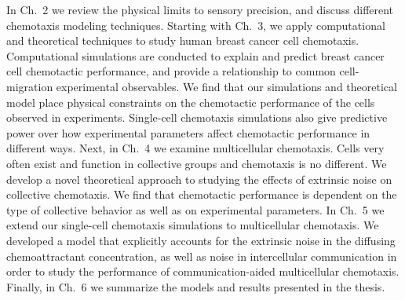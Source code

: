 In Ch.\ 2 we review the physical limits to sensory precision, and discuss different chemotaxis modeling techniques.
Starting with Ch.\ 3, we apply computational and theoretical techniques to study human breast cancer cell chemotaxis. Computational simulations are conducted to explain and predict breast cancer cell chemotactic performance, and provide a relationship to common cell-migration experimental observables. We find that our simulations and theoretical model place physical constraints on the chemotactic performance of the cells observed in experiments. Single-cell chemotaxis simulations also give predictive power over how experimental parameters affect chemotactic performance in different ways.
Next, in Ch.\ 4 we examine multicellular chemotaxis. Cells very often exist and function in collective groups and chemotaxis is no different. We develop a novel theoretical approach to studying the effects of extrinsic noise on collective chemotaxis. We find that chemotactic performance is dependent on the type of collective behavior as well as on experimental parameters.
In Ch.\ 5 we extend our single-cell chemotaxis simulations to multicellular chemotaxis. We developed a model that explicitly accounts for the extrinsic noise in the diffusing chemoattractant concentration, as well as noise in intercellular communication in order to study the performance of communication-aided multicellular chemotaxis.
Finally, in Ch.\ 6 we summarize the models and results presented in the thesis.
